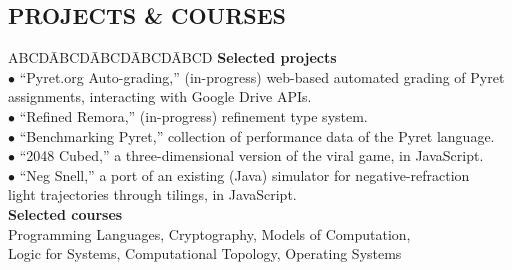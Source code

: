 \documentclass{res}
\newcommand{\myvspace}{\vspace{-0.09in}} %
\newcommand{\sectionVspace}{\vspace{-0.40in}}
\begin{document}
\begin{resume}
\section{PROJECTS \& COURSES} %
    \myvspace
    \begin{tabbing}
        ABCD\=ABCD\=ABCD\=ABCD\=ABCD\kill
        {\bf Selected projects}\\
            \>$\bullet$ ``Pyret.org Auto-grading,'' (in-progress) web-based automated grading of Pyret\\
                \>\phantom{$\bullet$} assignments, interacting with Google Drive APIs.\\
            \>$\bullet$ ``Refined Remora,'' (in-progress) refinement type system.\\
            \>$\bullet$ ``Benchmarking Pyret,'' collection of performance data of the Pyret language.\\
            \>$\bullet$ ``2048 Cubed,'' a three-dimensional version of the viral game, in JavaScript.\\
            \>$\bullet$ ``Neg Snell,'' a port of an existing (Java) simulator for negative-refraction\\
                \>\phantom{$\bullet$} light trajectories through tilings, in JavaScript.\\
        {\bf Selected courses}\\
            \>\phantom{$\bullet$} Programming Languages, Cryptography, Models of Computation,\\
            \>\phantom{$\bullet$} Logic for Systems, Computational Topology, Operating Systems
    \end{tabbing}

\end{resume}
\end{document}
